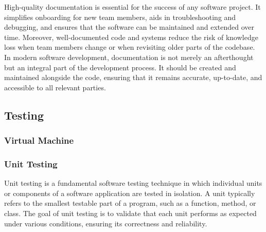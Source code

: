 High-quality documentation is essential for the success of any software project. It simplifies onboarding for new team members, aids in troubleshooting and debugging, and ensures that the software can be maintained and extended over time. Moreover, well-documented code and systems reduce the risk of knowledge loss when team members change or when revisiting older parts of the codebase. \cite{geeksforgeeks:doc} \\

In modern software development, documentation is not merely an afterthought but an integral part of the development process. It should be created and maintained alongside the code, ensuring that it remains accurate, up-to-date, and accessible to all relevant parties.

\subsection{}

\subsection{Testing}

\subsubsection*{Virtual Machine}

\subsubsection*{Unit Testing}



Unit testing is a fundamental software testing technique in which individual units or components of a software application are tested in isolation. A unit typically refers to the smallest testable part of a program, such as a function, method, or class. The goal of unit testing is to validate that each unit performs as expected under various conditions, ensuring its correctness and reliability. \cite{geeksforgeeks:unit-test} \\

